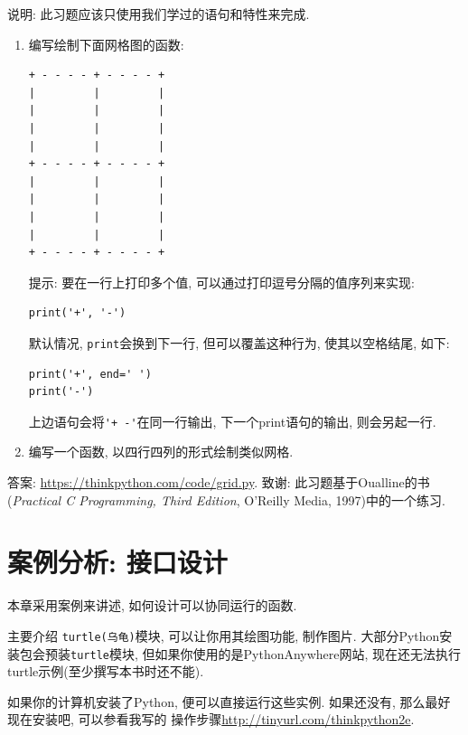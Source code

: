 \documentclass[10pt]{book}
\begin{document}
\begin{exercise}

说明: 此习题应该只使用我们学过的语句和特性来完成. 

\begin{enumerate}

\item 编写绘制下面网格图的函数:

\begin{verbatim}
+ - - - - + - - - - +
|         |         |
|         |         |
|         |         |
|         |         |
+ - - - - + - - - - +
|         |         |
|         |         |
|         |         |
|         |         |
+ - - - - + - - - - +
\end{verbatim}
%
提示: 要在一行上打印多个值, 可以通过打印逗号分隔的值序列来实现:

\begin{verbatim}
print('+', '-')
\end{verbatim}
%
默认情况, {\tt print}会换到下一行, 但可以覆盖这种行为, 
使其以空格结尾, 如下:

\begin{verbatim}
print('+', end=' ')
print('-')
\end{verbatim}
%
上边语句会将\verb"'+ -'"在同一行输出, 下一个print语句的输出, 则会另起一行. 

\item 编写一个函数, 以四行四列的形式绘制类似网格. 

\end{enumerate}

答案: \url{https://thinkpython.com/code/grid.py}.
致谢: 此习题基于Oualline的书
({\em Practical C Programming, Third Edition},  
O'Reilly Media, 1997)中的一个练习.

\end{exercise}


\chapter{案例分析: 接口设计}
\label{turtlechap}

本章采用案例来讲述, 如何设计可以协同运行的函数. 

主要介绍 {\tt turtle(乌龟)}模块, 可以让你用其绘图功能, 制作图片. 
大部分Python安装包会预装{\tt turtle}模块, 但如果你使用的是PythonAnywhere网站, 
现在还无法执行turtle示例(至少撰写本书时还不能). 

如果你的计算机安装了Python, 便可以直接运行这些实例. 
如果还没有, 那么最好现在安装吧, 可以参看我写的
操作步骤\url{http://tinyurl.com/thinkpython2e}. 
\end{document}

